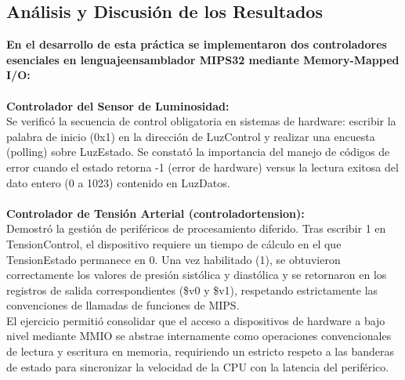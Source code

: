 \documentclass[12pt, a4paper]{article}
\begin{document}
\subsection{Análisis y Discusión de los Resultados}
    \textbf{En el desarrollo de esta práctica se implementaron dos controladores esenciales en lenguajeensamblador MIPS32 mediante Memory-Mapped I/O:}\\\\
    \textbf{Controlador del Sensor de Luminosidad:}\\ Se verificó la secuencia de control obligatoria en sistemas de hardware: escribir la palabra de inicio (0x1) en la dirección de LuzControl y realizar una encuesta (polling) sobre LuzEstado. Se constató la importancia del manejo de códigos de error cuando el estado retorna -1 (error de hardware) versus la lectura exitosa del dato entero (0 a 1023) contenido en LuzDatos.\\\\
    \textbf{Controlador de Tensión Arterial (controladortension):}\\ Demostró la gestión de periféricos de procesamiento diferido. Tras escribir 1 en TensionControl, el dispositivo requiere un tiempo de cálculo en el que TensionEstado permanece en 0. Una vez habilitado (1), se obtuvieron correctamente los valores de presión sistólica y diastólica y se retornaron en los registros de salida correspondientes (\$v0 y \$v1), respetando estrictamente las convenciones de llamadas de funciones de MIPS.\\
    El ejercicio permitió consolidar que el acceso a dispositivos de hardware a bajo nivel mediante MMIO se abstrae internamente como operaciones convencionales de lectura y escritura en memoria, requiriendo un estricto respeto a las banderas de estado para sincronizar la velocidad de la CPU con la latencia del periférico.
\end{document}
